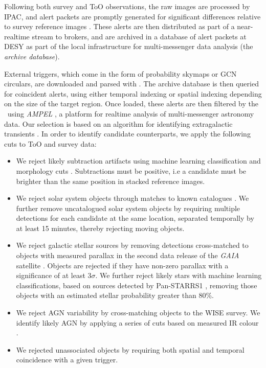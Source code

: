 Following both survey and ToO observations, the raw images are processed by IPAC, and alert packets are promptly generated for significant differences relative to survey reference images . These alerts are then distributed as part of a near-realtime stream to brokers, and are archived in a database of alert packets at DESY as part of the local infrastructure for multi-messenger data analysis (the \emph{archive database}).

External triggers, which come in the form of probability skymaps or GCN circulars, are downloaded and parsed with \ztf. The archive database is then queried for coincident alerts, using either temporal indexing or spatial indexing depending on the size of the target region. Once loaded, these alerts are then filtered by the \ztf~using \emph{AMPEL} , a platform for realtime analysis of multi-messenger astronomy data. Our selection is based on an algorithm for identifying extragalactic transients \cite{2019A&A...631A.147N}. In order to identify candidate counterparts, we apply the following cuts to ToO and survey data:

\begin{itemize}
	\item We reject likely subtraction artifacts using machine learning classification and morphology cuts . Subtractions must be positive, i.e a candidate must be brighter than the same position in stacked reference images.
	\item We reject solar system objects through matches to known catalogues \cite{2019PASP..131a8003M}. We further remove uncatalogued solar system objects by requiring multiple detections for each candidate at the same location, separated temporally by at least 15 minutes, thereby rejecting moving objects.
	\item We reject galactic stellar sources by removing detections cross-matched to objects with measured parallax in the second data release of the \emph{GAIA} satellite . Objects are rejected if they have non-zero parallax with a significance of at least 3$\sigma$. We further reject likely stars with machine learning classifications, based on sources detected by Pan-STARRS1 , removing those objects with an estimated stellar probability greater than 80\%. 
	\item We reject AGN variability by cross-matching objects to the WISE survey. We identify likely AGN by applying a series of cuts based on measured IR colour .
	\item We rejected unassociated objects by requiring both spatial and temporal coincidence with a given trigger.
\end{itemize}

